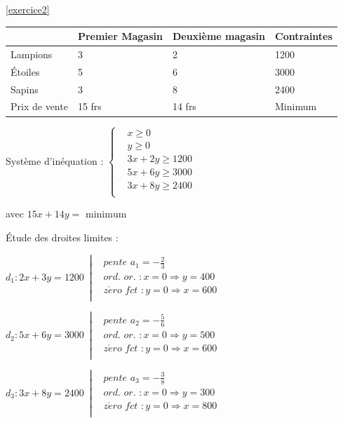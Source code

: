 \documentclass[twoside, a4paper, 12pt, openright, fullpage]{book}
\begin{document}
\begin{solutions}{\ref{exercice2}}

\begin{tabular}{|l|l|l|l|}
\hline
 & Premier Magasin & Deuxième magasin & Contraintes \\ \hline
Lampions & 3  & 2    & 1200     \\ \hline
Étoiles& 5  & 6    & 3000     \\ \hline
Sapins  & 3  & 8   & 2400      \\ \hline
Prix de vente   & 15 frs  & 14 frs  & Minimum    \\ \hline
\end{tabular}


Système d’inéquation : $\left\{ \begin{array}{ll}
  & x\ge 0 \\ 
 & y\ge 0 \\ 
 & 3x+2y\geq 1200 \\ 
 & 5x+6y\geq 3000 \\ 
 & 3x+8y\geq 2400 \\ 
\end{array} \right.$

avec $15x+14y=\,\,\text{minimum}$

Étude des droites limites : 

${{d}_{1}}:2x+3y=1200\,\,\,\left| \begin{array}{ll}
  & pente\,\,{{a}_{1}}=-\frac{2}{3} \\ 
 & ord.\,\,or.\,\,:x=0\Rightarrow y=400 \\ 
 & z\acute{e}ro\,\,fct\,\,:y=0\Rightarrow x=600 \\ 
\end{array} \right.$  

${{d}_{2}}:5x+6y=3000\,\,\,\left| \begin{array}{ll}
  & pente\,\,{{a}_{2}}=-\frac{5}{6} \\ 
 & ord.\,\,or.\,\,:x=0\Rightarrow y=500 \\ 
 & z\acute{e}ro\,\,fct\,\,:y=0\Rightarrow x=600 \\ 
\end{array} \right.$

${{d}_{3}}:3x+8y=2400\,\,\,\left| \begin{array}{ll}
  & pente\,\,{{a}_{3}}=-\frac{3}{8} \\ 
 & ord.\,\,or.\,\,:x=0\Rightarrow y=300 \\ 
 & z\acute{e}ro\,\,fct\,\,:y=0\Rightarrow x=800 \\ 
\end{array} \right.$  


\end{solutions}
\end{document}
